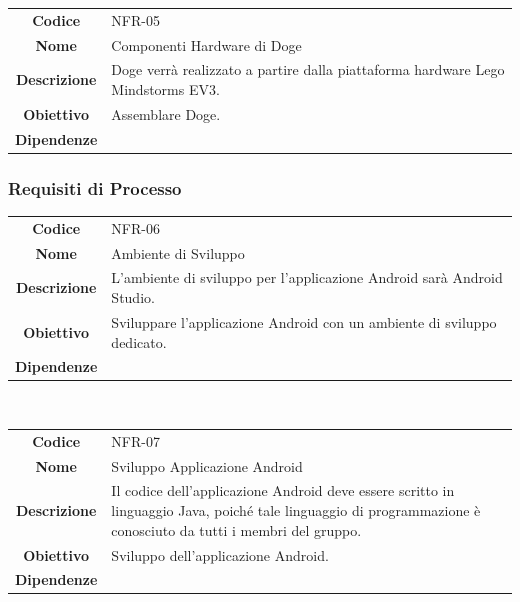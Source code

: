 \documentclass{article}
\begin{document}
    \begin{adjustbox}{center}
    \begin{tabular}{|c|p{10cm}|}
    \hline
    \textbf{Codice} & NFR-05 \\
    \textbf{Nome} & Componenti Hardware di Doge \\
    \textbf{Descrizione} & Doge verrà realizzato a partire dalla piattaforma hardware Lego Mindstorms EV3. \\
    \textbf{Obiettivo} & Assemblare Doge. \\
    \textbf{Dipendenze} &  \\
    \hline
    \end{tabular}
    \end{adjustbox}
    
    \subsubsection{Requisiti di Processo}
    
    \begin{adjustbox}{center}
    \begin{tabular}{|c|p{10cm}|}
    \hline
    \textbf{Codice} & NFR-06 \\
    \textbf{Nome} & Ambiente di Sviluppo \\
    \textbf{Descrizione} & L'ambiente di sviluppo per l'applicazione Android sarà Android Studio. \\
    \textbf{Obiettivo} & Sviluppare l'applicazione Android con un ambiente di sviluppo dedicato. \\
    \textbf{Dipendenze} &  \\
    \hline
    \end{tabular}
    \end{adjustbox}
    
    ~
    
    \begin{adjustbox}{center}
    \begin{tabular}{|c|p{10cm}|}
    \hline
    \textbf{Codice} & NFR-07 \\
    \textbf{Nome} & Sviluppo Applicazione Android \\
    \textbf{Descrizione} & Il codice dell'applicazione Android deve essere scritto in linguaggio Java, poiché tale linguaggio di programmazione è conosciuto da tutti i membri del gruppo. \\
    \textbf{Obiettivo} & Sviluppo dell'applicazione Android. \\
    \textbf{Dipendenze} &  \\
    \hline
    \end{tabular}
    \end{adjustbox}
    
\end{document}
